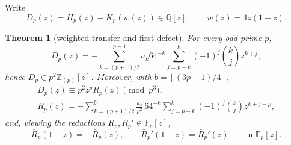 \documentclass[11pt]{amsart}
\newtheorem{theorem}{Theorem}[section]
\theoremstyle{definition}
\theoremstyle{remark}
\newcommand{\Fp}{\mathbb{F}_p}
\newcommand{\Q}{\mathbb{Q}}
\newcommand{\Zp}{\mathbb{Z}_{(p)}}
\newcommand{\fl}[1]{\left\lfloor #1 \right\rfloor}
\begin{document}
Write
\[
D_p(z)=H_p(z)-K_p(w(z))\in\Q[z],
\qquad w(z)=4z(1-z).
\]

\begin{theorem}[weighted transfer and first defect]\label{thm:C}
For every odd prime $p$,
\[
D_p(z)=
-\sum_{k=(p+1)/2}^{p-1}a_k64^{-k}
\sum_{j=p-k}^{k}(-1)^j\binom{k}{j}z^{k+j},
\]
hence $D_p\in p^2\Zp[z]$. Moreover, with $b=\fl{(3p-1)/4}$,
\begin{equation}\label{eq:defect}
\begin{gathered}
D_p(z)\equiv p^2z^pR_p(z)\pmod{p^3},\\
R_p(z)=-\sum_{k=(p+1)/2}^{b}\frac{a_k}{p^2}\,64^{-k}
\sum_{j=p-k}^{k}(-1)^j\binom{k}{j}z^{k+j-p},
\end{gathered}
\end{equation}
and, viewing the reductions $\bar R_p,\bar R_p'\in\Fp[z]$,
\begin{equation}\label{eq:refl}
\bar R_p(1-z)=-\bar R_p(z),\qquad \bar R_p'(1-z)=\bar R_p'(z)
\qquad\text{in }\Fp[z].
\end{equation}
\end{theorem}
\end{document}
